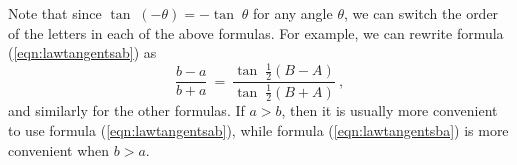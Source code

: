 
Note that since $\tan\;(-\theta) = -\tan\;\theta$ for any angle $\theta$, we
can switch the order of the letters in each of the above formulas. For example, we can rewrite
formula (\ref{eqn:lawtangentsab}) as
\begin{equation}\label{eqn:lawtangentsba}
 \frac{b-a}{b+a}~=~\frac{\tan\;\frac{1}{2}(B-A)}{\tan\;\frac{1}{2}(B+A)}~,
\end{equation}
and similarly for the other formulas. If $a > b$, then it is usually more convenient to use
formula (\ref{eqn:lawtangentsab}), while formula (\ref{eqn:lawtangentsba}) is more convenient when
$b > a$.

